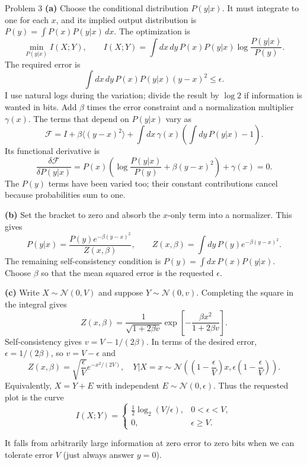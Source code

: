 \documentclass[12pt,a4paper]{article}
\begin{document}
\begin{solution}{Problem 3}
\textbf{(a)} Choose the conditional distribution $P(y|x)$. It must integrate
to one for each $x$, and its implied output distribution is
$P(y)=\int P(x)P(y|x)\,dx$. The optimization is
\[
 \min_{P(y|x)} I(X;Y),\qquad
 I(X;Y)=\int dx\,dy\,P(x)P(y|x)\log\frac{P(y|x)}{P(y)}.
\]
The required error is
\[
 \int dx\,dy\,P(x)P(y|x)(y-x)^2\leq\epsilon.
\]
I use natural logs during the variation; divide the result by $\log 2$ if
information is wanted in bits. Add $\beta$ times the error constraint and
a normalization multiplier $\gamma(x)$. The terms that depend on $P(y|x)$
vary as
\[
 \mathcal F=I+\beta\langle(y-x)^2\rangle
 +\int dx\,\gamma(x)\left(\int dy\,P(y|x)-1\right).
\]
Its functional derivative is
\[
 \frac{\delta\mathcal F}{\delta P(y|x)}
 =P(x)\left(\log\frac{P(y|x)}{P(y)}+\beta(y-x)^2\right)
 +\gamma(x)=0.
\]
The $P(y)$ terms have been varied too; their constant contributions cancel
because probabilities sum to one.

\textbf{(b)} Set the bracket to zero and absorb the $x$-only term into a
normalizer. This gives
\[
 \boxed{P(y|x)=\frac{P(y)e^{-\beta(y-x)^2}}{Z(x,\beta)}},\qquad
 \boxed{Z(x,\beta)=\int dy\,P(y)e^{-\beta(y-x)^2}}.
\]
The remaining self-consistency condition is
$\boxed{P(y)=\int dx\,P(x)P(y|x)}$. Choose $\beta$ so that the mean squared
error is the requested $\epsilon$.

\textbf{(c)} Write $X\sim\mathcal N(0,V)$ and suppose
$Y\sim\mathcal N(0,v)$. Completing the square in the integral gives
\[
 Z(x,\beta)=\frac{1}{\sqrt{1+2\beta v}}
       \exp\!\left[-\frac{\beta x^2}{1+2\beta v}\right].
\]
Self-consistency gives $v=V-1/(2\beta)$. In terms of the desired error,
$\epsilon=1/(2\beta)$, so $v=V-\epsilon$ and
\[
 Z(x,\beta)=\sqrt{\frac{\epsilon}{V}}
                  e^{-x^2/(2V)},\quad
 Y|X=x\sim\mathcal N\!\left(
  \left(1-\frac{\epsilon}{V}\right)x,
  \epsilon\left(1-\frac{\epsilon}{V}\right)\right).
\]
Equivalently, $X=Y+E$ with independent $E\sim\mathcal N(0,\epsilon)$.
Thus the requested plot is the curve
\[
 \boxed{I(X;Y)=\begin{cases}
   \tfrac12\log_2(V/\epsilon),&0<\epsilon<V,\\
   0,&\epsilon\geq V.
 \end{cases}}
\]
\begin{center}
\end{center}
It falls from arbitrarily large information at zero error to zero bits
when we can tolerate error $V$ (just always answer $y=0$).
\end{solution}
\end{document}
